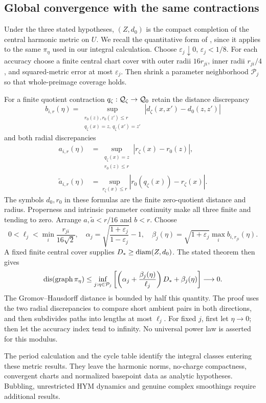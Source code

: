 \subsection{Global convergence with the same contractions}
Under the three stated hypotheses, $(Z,d_0)$ is the
compact completion of the central harmonic metric on
$U$. We recall the quantitative form of
\cite[Theorem~5.5]{wuebben18}, since it applies to the
same $\pi_\eta$ used in our integral calculation.
Choose $\varepsilon_j\downarrow0$, $\varepsilon_j<1/8$.
For each accuracy choose a finite central chart cover
with outer radii $16r_{ji}$, inner radii $r_{ji}/4$,
and squared-metric error at most $\varepsilon_j$.
Then shrink a parameter neighborhood $\mathcal P_j$
so that whole-preimage coverage holds.

For a finite quotient contraction $q_\zeta:\mathcal Q_\zeta\to\mathcal Q_0$
retain the distance discrepancy
\[
 b_{i,r}(\eta)=\sup_{\substack{r_0(z),r_0(z')\le r\\
                    q_\zeta(x)=z,\ q_\zeta(x')=z'}}
       |d_\zeta(x,x')-d_0(z,z')|
\]
and both radial discrepancies
\[
 \begin{aligned}
 a_{i,r}(\eta)&=\sup_{\substack{q_\zeta(x)=z\\r_0(z)\le r}}
                     |r_\zeta(x)-r_0(z)|,\\
 \widetilde a_{i,r}(\eta)&=\sup_{r_\zeta(x)\le r}
                     |r_0(q_\zeta(x))-r_\zeta(x)|.
 \end{aligned}
\]
The symbols $d_0,r_0$ in these formulas are the finite
zero-quotient distance and radius. Properness and
intrinsic parameter continuity make all three finite
and tending to zero. Arrange $a,\widetilde a<r/16$
and $b<r$. Choose
\[
 0<\ell_j<\min_i\frac{r_{ji}}{16\sqrt2},\quad
 \alpha_j=\sqrt{\frac{1+\varepsilon_j}{1-\varepsilon_j}}-1,
 \quad\beta_j(\eta)=\sqrt{1+\varepsilon_j}
                         \max_i b_{i,r_{ji}}(\eta).
\]
A fixed finite central cover supplies
$D_*\ge\operatorname{diam}(Z,d_0)$. The stated theorem then gives
\begin{equation}\label{eq:global-distortion}
 \operatorname{dis}(\operatorname{graph}\pi_\eta)
 \le\inf_{j:\eta\in\mathcal P_j}
 \left[\left(\alpha_j+\frac{\beta_j(\eta)}{\ell_j}\right)D_*
                  +\beta_j(\eta)\right]\longrightarrow0.
\end{equation}
The Gromov--Hausdorff distance is bounded by half this
quantity. The proof uses the two radial discrepancies
to compare short ambient pairs in both directions,
and then subdivides paths into lengths at most $\ell_j$.
For fixed $j$, first let $\eta\to0$; then let the
accuracy index tend to infinity. No universal power
law is asserted for this modulus.

The period calculation and the cycle table identify
the integral classes entering these metric results.
They leave the harmonic norms, no-charge compactness,
convergent charts and normalized basepoint data as
analytic hypotheses. Bubbling, unrestricted HYM
dynamics and genuine complex smoothings require
additional results.
